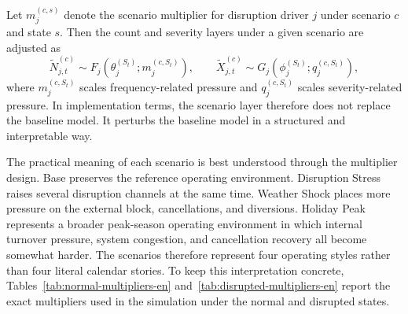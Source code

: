 \documentclass[11pt]{article}
\begin{document}
Let \(m^{(c,s)}_{j}\) denote the scenario multiplier for disruption driver \(j\) under scenario \(c\) and state \(s\). Then the count and severity layers under a given scenario are adjusted as
\[
\tilde{N}^{(c)}_{j,t} \sim F_j\!\left(\theta_j^{(S_t)}; m^{(c,S_t)}_{j}\right),
\qquad
\tilde{X}^{(c)}_{j,t} \sim G_j\!\left(\phi_j^{(S_t)}; q^{(c,S_t)}_{j}\right),
\]
where \(m^{(c,S_t)}_{j}\) scales frequency-related pressure and \(q^{(c,S_t)}_{j}\) scales severity-related pressure. In implementation terms, the scenario layer therefore does not replace the baseline model. It perturbs the baseline model in a structured and interpretable way.

The practical meaning of each scenario is best understood through the multiplier design. Base preserves the reference operating environment. Disruption Stress raises several disruption channels at the same time. Weather Shock places more pressure on the external block, cancellations, and diversions. Holiday Peak represents a broader peak-season operating environment in which internal turnover pressure, system congestion, and cancellation recovery all become somewhat harder. The scenarios therefore represent four operating styles rather than four literal calendar stories. To keep this interpretation concrete, Tables~\ref{tab:normal-multipliers-en} and~\ref{tab:disrupted-multipliers-en} report the exact multipliers used in the simulation under the normal and disrupted states.

\begin{table}[H]
\centering
\caption{Scenario multipliers in the normal state}
\label{tab:normal-multipliers-en}
\end{table}
\end{document}
